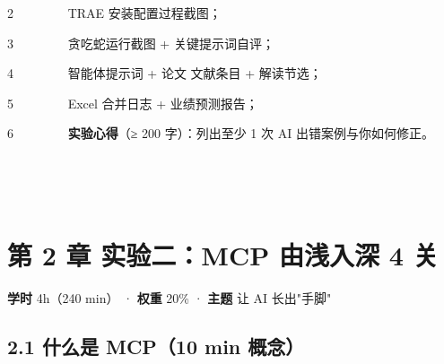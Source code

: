\documentclass[
  american,
  chinese,
]{ctexart}
\begin{document}
\foreignlanguage{american}{{2{~~~~~~~~
}}}\foreignlanguage{american}{TRAE }{安装配置过程截图；}\foreignlanguage{american}{}

\foreignlanguage{american}{{3{~~~~~~~~
}}}{贪吃{蛇运行截}图}\foreignlanguage{american}{ + }{关键提示词自评；}\foreignlanguage{american}{}

\foreignlanguage{american}{{4{~~~~~~~~
}}}{智能体提示词}\foreignlanguage{american}{ + }{论文}{ }{文献条目}\foreignlanguage{american}{ + }{解读节选；}\foreignlanguage{american}{}

\foreignlanguage{american}{{5{~~~~~~~~
}}}\foreignlanguage{american}{Excel }{合并日志}\foreignlanguage{american}{ + }{业绩预测报告；}\foreignlanguage{american}{}

\foreignlanguage{american}{{6{~~~~~~~~
}}}\textbf{{实验心得}}{（}\foreignlanguage{american}{≥ 200 }{字）：列出至少}\foreignlanguage{american}{ 1 }{次}\foreignlanguage{american}{ AI }{出错案例与你如何修正。}\foreignlanguage{american}{}

\foreignlanguage{american}{\hfill\break
}

\foreignlanguage{american}{}

~

\foreignlanguage{american}{}

~

\clearpage

\section{\texorpdfstring{{第}\foreignlanguage{american}{ 2 }{章}{ }{实验二：}\foreignlanguage{american}{MCP }{由浅入深}\foreignlanguage{american}{ 4 }{关}\foreignlanguage{american}{}}{第 2 章 实验二：MCP 由浅入深 4 关}}\label{ux7b2c-2-ux7ae0-ux5b9eux9a8cux4e8cmcp-ux7531ux6d45ux5165ux6df1-4-ux5173}

\textbf{{学时}}\foreignlanguage{american}{ 4h}{（}\foreignlanguage{american}{240 min}{）}{ \foreignlanguage{american}{· }}\textbf{{权重}}\foreignlanguage{american}{ 20\% · }\textbf{{主题}}{ }{让}\foreignlanguage{american}{ AI }{长出}\foreignlanguage{american}{"}{手脚}\foreignlanguage{american}{"}

\subsection{\texorpdfstring{\foreignlanguage{american}{2.1 }{\foreignlanguage{american}{什么是}}\foreignlanguage{american}{ MCP}\foreignlanguage{american}{（}\foreignlanguage{american}{10 min }{\foreignlanguage{american}{概念}}\foreignlanguage{american}{）}}{2.1 什么是 MCP（10 min 概念）}}\label{ux4ec0ux4e48ux662f-mcp10-min-ux6982ux5ff5}
\end{document}
